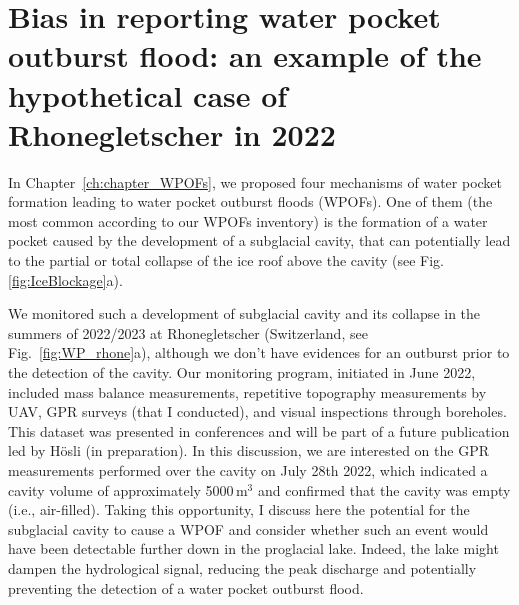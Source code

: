 \section{Bias in reporting water pocket outburst flood: an example of the hypothetical case of Rhonegletscher in 2022}


In Chapter~\ref{ch:chapter_WPOFs}, we proposed four mechanisms of water pocket formation leading to water pocket outburst floods (WPOFs). One of them (the most common according to our WPOFs inventory) is the formation of a water pocket caused by the development of a subglacial cavity, that can potentially lead to the partial or total collapse of the ice roof above the cavity (see Fig.\ref{fig:IceBlockage}a). 

We monitored such a development of subglacial cavity and its collapse in the summers of 2022/2023 at Rhonegletscher (Switzerland, see Fig.~\ref{fig:WP_rhone}a), although we don't have evidences for an outburst prior to the detection of the cavity. Our monitoring program, initiated in June 2022, included mass balance measurements, repetitive topography measurements by UAV, GPR surveys (that I conducted), and visual inspections through boreholes. This dataset was presented in conferences \citep{Ogier&al2022,Hosli&al2022,Bauder&al2023} and  will be part of a future publication led by Hösli (in preparation). In this discussion, we are interested on the GPR measurements performed over the cavity on July 28th 2022, which indicated a cavity volume of approximately 5000\,m$^3$ and confirmed that the cavity was empty (i.e., air-filled). Taking this opportunity, I discuss here the potential for the subglacial cavity to cause a WPOF and consider whether such an event would have been detectable further down in the proglacial lake. Indeed, the lake might dampen the hydrological signal, reducing the peak discharge and potentially preventing the detection of a water pocket outburst flood. 

